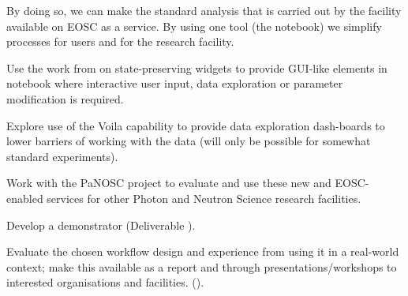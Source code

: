 \begin{task}[
  title=Reproducible photon science workflows at European XFEL,
  id=reproducibility-xfel,
  lead=XFEL,
  PM=38,
  wphases={7-48},
  partners={INSERM,SRL,UPSUD,EGI}
  ]
\begin{compactitem}
    By doing so, we can make the standard analysis that is carried out
    by the facility available on EOSC as a service. By using one tool
    (the notebook) we simplify processes for users and for the research
    facility.

  \item Use the work from  on
    state-preserving widgets to provide GUI-like elements in notebook
    where interactive user input, data exploration or parameter
    modification is required.

  \item Explore use of the Voila capability to provide
    data exploration dash-boards to lower barriers of working with the
    data (will only be possible for somewhat standard experiments).

  \item Work with the PaNOSC project \cite{panosc} to evaluate and use
    these new and EOSC-enabled services for other Photon and Neutron
    Science research facilities.
  \item Develop a demonstrator (Deliverable ).

  \item Evaluate the chosen workflow design and experience from using
    it in a real-world context; make this available as a report and
    through presentations/workshops to interested organisations and
    facilities. ().




  \end{compactitem}

 \end{task}
